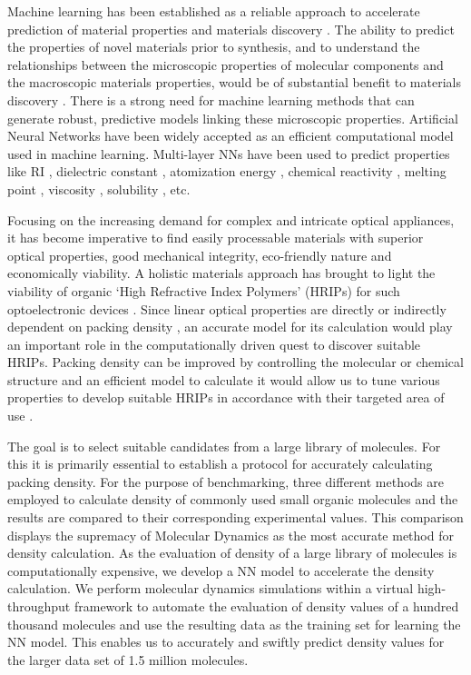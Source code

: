 Machine learning has been established as a reliable approach to accelerate prediction of material properties and materials discovery \cite{Olivares-Amaya2011}. The ability to predict the properties of novel materials prior to synthesis, and to understand the relationships between the microscopic properties of molecular components and the macroscopic materials properties, would be of substantial benefit to materials discovery \cite{Hachmann2014}. There is a strong need for machine learning methods that can generate robust, predictive models linking these microscopic properties. Artificial Neural Networks have been widely accepted as an efficient computational model used in machine learning. Multi-layer NNs have been used to predict properties like RI \cite{Alexandridis2012}, dielectric constant \cite{Mannodi-Kanakkithodi2016}, atomization energy \cite{Montavon2012}, chemical reactivity \cite{Simon1993}, melting point \cite{Karthikeyan2005}, viscosity \cite{Gharagheizi2007}, solubility \cite{Huuskonen1998}, etc.

Focusing on the increasing demand for complex and intricate optical appliances, it has become imperative to find easily processable materials with superior optical properties, good mechanical integrity, eco-friendly nature and economically viability. A holistic materials approach has brought to light the viability of organic ‘High Refractive Index Polymers’ (HRIPs) for such optoelectronic devices \cite{Higashihara2015} \cite{Macdonald2014}. Since linear optical properties are directly or indirectly dependent on packing density \cite{Terui2004}, an accurate model for its calculation would play an important role in the computationally driven quest to discover suitable HRIPs. Packing density can be improved by controlling the molecular or chemical structure and an efficient model to calculate it would allow us to tune various properties to develop suitable HRIPs in accordance with their targeted area of use \cite{Tanio1994}.  

The goal is to select suitable candidates from a large library of molecules. For this it is primarily essential to establish a protocol for accurately calculating packing density. For the purpose of benchmarking, three different methods are employed to calculate density of commonly used small organic molecules and the results are compared to their corresponding experimental values. This comparison displays the supremacy of Molecular Dynamics as the most accurate method for density calculation. As the evaluation of density of a large library of molecules is computationally expensive, we develop a NN model to accelerate the density calculation. We perform molecular dynamics simulations within a virtual high-throughput framework to automate the evaluation of density values of a hundred thousand molecules and use the resulting data as the training set for learning the NN model. This enables us to accurately and swiftly predict density values for the larger data set of 1.5 million molecules.

